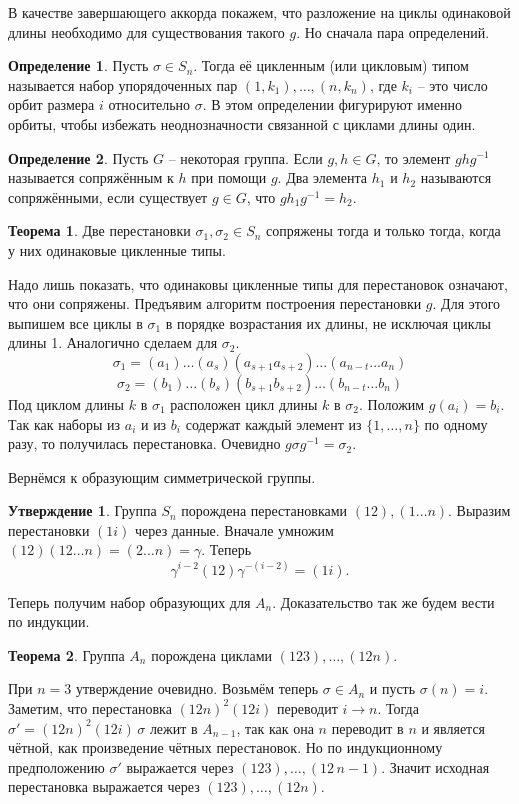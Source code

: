 \documentclass[10pt,a4paper,oneside]{book}
\theoremstyle{definition}
\newtheorem*{defn}{\color{yellow!30!red} Определение}
\newtheorem{thm}{\color{red!40!black}Теорема}
\newtheorem{utvr}{\color{blue!50!black}Утверждение}
\def\thrm{\begin{thm}}
\def\ethrm{\end{thm}}
\def\dfn{\begin{defn}}
\def\edfn{\end{defn}}
\def\utv{\begin{utvr}}
\def\eutv{\end{utvr}}
\begin{document}
В качестве завершающего аккорда покажем, что разложение на циклы одинаковой длины необходимо для существования такого $g$. Но сначала пара определений.
\dfn Пусть $\sigma \in S_n$. Тогда её цикленным (или цикловым) типом называется набор упорядоченных пар $(1,k_1),\dots, (n,k_n)$, где $k_i$ -- это число орбит размера $i$ относительно $\sigma$. В этом определении фигурируют именно орбиты, чтобы избежать неоднозначности связанной с циклами длины один.
\edfn

\dfn Пусть $G$ -- некоторая группа. Если $g,h\in G$, то элемент $ghg^{-1}$ называется сопряжённым к $h$ при помощи $g$. Два элемента $h_1$ и $h_2$ называются сопряжёнными, если существует $g \in G$, что $gh_1g^{-1}=h_2$.
\edfn 

\thrm Две перестановки $\sigma_1,\sigma_2\in S_n$ сопряжены тогда и только тогда, когда у них одинаковые цикленные типы.
\ethrm
\proof Надо лишь показать, что одинаковы цикленные типы для перестановок означают, что они сопряжены. Предъявим алгоритм построения перестановки $g$. Для этого выпишем все циклы в $\sigma_1$ в порядке возрастания их длины, не исключая циклы длины 1. Аналогично сделаем для $\sigma_2$. 
$$\sigma_1=(a_1)\dots(a_s)(a_{s+1}a_{s+2})\dots (a_{n-t}\dots a_n)$$
$$\sigma_2=(b_1)\dots(b_s)(b_{s+1}b_{s+2})\dots (b_{n-t}\dots b_n)$$
Под циклом длины $k$ в $\sigma_1$ расположен цикл длины $k$ в $\sigma_2$. Положим $g(a_i)=b_i$. Так как наборы из $a_i$ и из $b_i$ содержат каждый элемент из $\{1,\dots,n\}$ по одному разу, то получилась перестановка. Очевидно $g\sigma g^{-1}=\sigma_2$.
\endproof

Вернёмся к образующим симметрической группы.

\utv Группа $S_n$ порождена перестановками $(12), (1 \dots n)$. 
\proof Выразим перестановки $(1i)$ через данные. Вначале умножим $(12)(12\dots n)=(2\dots n)=\gamma$. Теперь
$$\gamma^{i-2}(12)\gamma^{-(i-2)}=(1i).$$
\endproof
\eutv

Теперь получим набор образующих для $A_n$. Доказательство так же будем вести по индукции.


\thrm Группа $A_n$ порождена циклами $(123),\dots,(12n)$. 
\ethrm
\proof При $n=3$ утверждение очевидно. Возьмём теперь $\sigma\in A_n$ и пусть $\sigma(n)=i$. Заметим, что перестановка $(12n)^2(12i)$ переводит $i\to n$. Тогда $\sigma'=(12n)^2(12i) \,\sigma$ лежит в  $A_{n-1}$, так как она $n$ переводит в $n$ и является чётной, как произведение чётных перестановок. Но по индукционному предположению $\sigma'$ выражается через $(123),\dots,(12\,n-1)$. Значит исходная перестановка выражается через $(123),\dots,(12n)$.
\endproof
\end{document}
